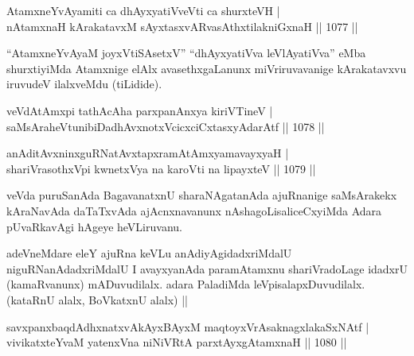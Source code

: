
\begin{shl}
AtamxneYvAyamiti ca dhAyxyatiVveVti ca shurxteVH | \\
nA\s \s tamxnaH kArakatavxM sAyxtasxvARvasAthxtilakniGxnaH \hfill||  1077 || 
\end{shl}

\begin{artha}
``AtamxneYvAyaM joyxVtiSA\s \s setxV'' ``dhAyxyatiVva leVlAyatiVva'' eMba shurxtiyiMda Atamxnige elAlx avasethxgaLanunx miVriruvavanige kArakatavxvu iruvudeV ilalxveMdu (tiLidide).
\end{artha}


\begin{shl}
veVdAtAmx\s pi tathAcA\s \s ha parxpanAnxya kiriVTineV | \\
saMsAraheVtunibiDadhAvxnotxVcicxciCxtasxyA\s \s darAtf \hfill||  1078 || 
\end{shl}
				
\begin{shl}
anAditAvxninxguRNatAvxtapxramAtAmx\s yamavayxyaH | \\
shariVrasothxV\s pi kwnetxVya na karoVti na lipayxteV \hfill||  1079 ||  
\end{shl}

\begin{artha}
veVda puruSanAda BagavanatxnU sharaNAgatanAda ajuRnanige saMsArakekx kAraNavAda daTaTxvAda ajAcnxnavanunx nAshagoLisaliceCxyiMda Adara pUvaRkavAgi hAgeye heVLiruvanu.
\end{artha}

\begin{artha}
adeVneMdare eleY ajuRna keVLu anAdiyAgidadxriMdalU niguRNanAdadxriMdalU I avayxyanAda paramAtamxnu shariVradoLage idadxrU (kamaRvanunx) mADuvudilalx. adara PaladiMda leVpisalapxDuvudilalx. (kataRnU alalx, BoVkatxnU alalx) ||
\end{artha}


\begin{shl}
savxpanxbaqdAdhxnatxvAkAyxBAyxM maqtoyxVrAsaknagxlakaSxNAtf | \\
vivikatxteYvaM yatenxVna niNiVRtA parxtAyxgAtamxnaH \hfill||  1080 ||  
\end{shl}

